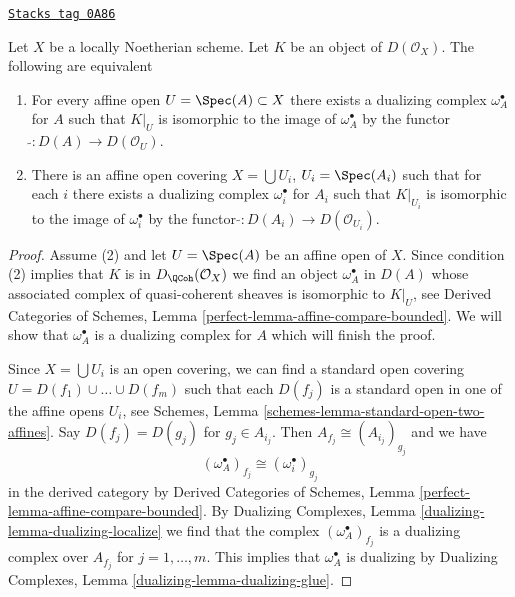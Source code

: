 \begin{lemma}
\label{duality-lemma-equivalent-definitions}
\href{https://stacks.math.columbia.edu/tag/0A86}{\texttt{Stacks tag 0A86}}

Let $X$ be a locally Noetherian scheme. Let $K$ be an object of
$D(\mathcal{O}_X)$. The following are equivalent
\begin{enumerate}
\item For every affine open $U = \Spec(A) \subset X$ there exists
a dualizing complex $\omega_A^\bullet$ for $A$ such that
$K|_U$ is isomorphic to the image of $\omega_A^\bullet$ by
the functor $\widetilde{} : D(A) \to D(\mathcal{O}_U)$.
\item There is an affine open covering $X = \bigcup U_i$, $U_i = \Spec(A_i)$
such that for each $i$ there exists a dualizing complex $\omega_i^\bullet$ for
$A_i$ such that $K|_{U_i}$ is isomorphic to the image of $\omega_i^\bullet$ by
the functor $\widetilde{} : D(A_i) \to D(\mathcal{O}_{U_i})$.
\end{enumerate}
\end{lemma}

\begin{proof}
Assume (2) and let $U = \Spec(A)$ be an affine open of $X$.
Since condition (2) implies that $K$ is in $D_\QCoh(\mathcal{O}_X)$
we find an object $\omega_A^\bullet$ in $D(A)$ whose associated
complex of quasi-coherent sheaves is isomorphic to $K|_U$, see
Derived Categories of Schemes, Lemma
\ref{perfect-lemma-affine-compare-bounded}.
We will show that $\omega_A^\bullet$ is a dualizing complex for $A$
which will finish the proof.

\medskip\noindent
Since $X = \bigcup U_i$ is an open covering, we can find a standard
open covering $U = D(f_1) \cup \ldots \cup D(f_m)$ such that
each $D(f_j)$ is a standard open in one of the affine opens $U_i$, see
Schemes, Lemma \ref{schemes-lemma-standard-open-two-affines}.
Say $D(f_j) = D(g_j)$ for $g_j \in A_{i_j}$.
Then $A_{f_j} \cong (A_{i_j})_{g_j}$ and we have
$$
(\omega_A^\bullet)_{f_j} \cong (\omega_i^\bullet)_{g_j}
$$
in the derived category by
Derived Categories of Schemes, Lemma
\ref{perfect-lemma-affine-compare-bounded}.
By Dualizing Complexes, Lemma \ref{dualizing-lemma-dualizing-localize}
we find that
the complex $(\omega_A^\bullet)_{f_j}$ is a dualizing complex over
$A_{f_j}$ for $j = 1, \ldots, m$. This implies that $\omega_A^\bullet$
is dualizing by
Dualizing Complexes, Lemma \ref{dualizing-lemma-dualizing-glue}.
\end{proof}

